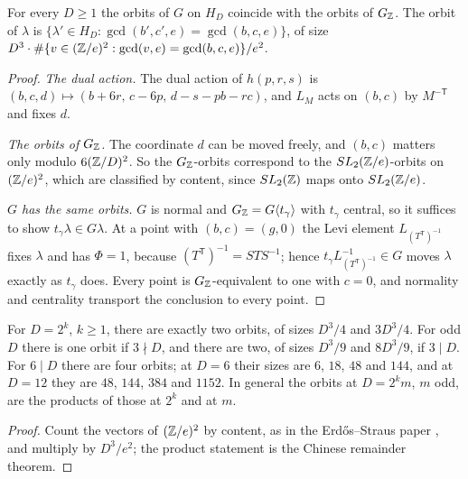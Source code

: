 \begin{theorem}\label{thm:orbitsS6}
For every $D\ge1$ the orbits of $G$ on $H_D$ coincide with the orbits of $G_{\mathbb{Z}}$. The orbit of $\lambda$ is $\{\lambda'\in H_D:\gcd(b',c',e)=\gcd(b,c,e)\}$, of size $D^3\cdot\#\{v\in(\mathbb{Z}/e)^2:\gcd(v,e)=\gcd(b,c,e)\}/e^2$.
\end{theorem}
\begin{proof}
\emph{The dual action.} The dual action of $h(p,r,s)$ is $(b,c,d)\mapsto(b+6r,\,c-6p,\,d-s-pb-rc)$, and $L_M$ acts on $(b,c)$ by $M^{-\mathsf T}$ and fixes $d$.

\emph{The orbits of $G_{\mathbb{Z}}$.} The coordinate $d$ can be moved freely, and $(b,c)$ matters only modulo $6(\mathbb{Z}/D)^2$. So the $G_{\mathbb{Z}}$-orbits correspond to the $SL_2(\mathbb{Z}/e)$-orbits on $(\mathbb{Z}/e)^2$, which are classified by content, since $SL_2(\mathbb{Z})$ maps onto $SL_2(\mathbb{Z}/e)$.

\emph{$G$ has the same orbits.} $G$ is normal and $G_{\mathbb{Z}}=G\langle t_\gamma\rangle$ with $t_\gamma$ central, so it suffices to show $t_\gamma\lambda\in G\lambda$. At a point with $(b,c)=(g,0)$ the Levi element $L_{(T^{\mathsf T})^{-1}}$ fixes $\lambda$ and has $\Phi=1$, because $(T^{\mathsf T})^{-1}=STS^{-1}$; hence $t_\gamma L_{(T^{\mathsf T})^{-1}}^{-1}\in G$ moves $\lambda$ exactly as $t_\gamma$ does. Every point is $G_{\mathbb{Z}}$-equivalent to one with $c=0$, and normality and centrality transport the conclusion to every point.
\end{proof}

\begin{corollary}\label{cor:orbitsS6}
For $D=2^k$, $k\ge1$, there are exactly two orbits, of sizes $D^3/4$ and $3D^3/4$. For odd $D$ there is one orbit if $3\nmid D$, and there are two, of sizes $D^3/9$ and $8D^3/9$, if $3\mid D$. For $6\mid D$ there are four orbits; at $D=6$ their sizes are $6$, $18$, $48$ and $144$, and at $D=12$ they are $48$, $144$, $384$ and $1152$. In general the orbits at $D=2^km$, $m$ odd, are the products of those at $2^k$ and at $m$.
\end{corollary}
\begin{proof}
Count the vectors of $(\mathbb{Z}/e)^2$ by content, as in the Erdős--Straus paper \cite[Corollary~5.2]{ESPaper}, and multiply by $D^3/e^2$; the product statement is the Chinese remainder theorem.
\end{proof}

